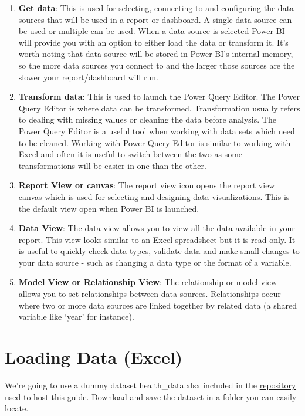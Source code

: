 \documentclass[
]{book}
\begin{document}
\begin{enumerate}
\def\labelenumi{\arabic{enumi}.}
\item
  \textbf{Get data}: This is used for selecting, connecting to and configuring the data sources that will be used in a report or dashboard. A single data source can be used or multiple can be used. When a data source is selected Power BI will provide you with an option to either load the data or transform it. It's worth noting that data source will be stored in Power BI's internal memory, so the more data sources you connect to and the larger those sources are the slower your report/dashboard will run.
\item
  \textbf{Transform data}: This is used to launch the Power Query Editor. The Power Query Editor is where data can be transformed. Transformation usually refers to dealing with missing values or cleaning the data before analysis. The Power Query Editor is a useful tool when working with data sets which need to be cleaned. Working with Power Query Editor is similar to working with Excel and often it is useful to switch between the two as some transformations will be easier in one than the other.
\item
  \textbf{Report View or canvas}: The report view icon opens the report view canvas which is used for selecting and designing data visualizations. This is the default view open when Power BI is launched.
\item
  \textbf{Data View}: The data view allows you to view all the data available in your report. This view looks similar to an Excel spreadsheet but it is read only. It is useful to quickly check data types, validate data and make small changes to your data source - such as changing a data type or the format of a variable.
\item
  \textbf{Model View or Relationship View}: The relationship or model view allows you to set relationships between data sources. Relationships occur where two or more data sources are linked together by related data (a shared variable like `year' for instance).
\end{enumerate}

\hypertarget{loading-data-excel}{%
\section{Loading Data (Excel)}\label{loading-data-excel}}

We're going to use a dummy dataset health\_data.xlsx included in the \href{https://github.com/aamcmurray/Power-BI/blob/main/health_data.xlsx}{repository used to host this guide}. Download and save the dataset in a folder you can easily locate.
\end{document}
